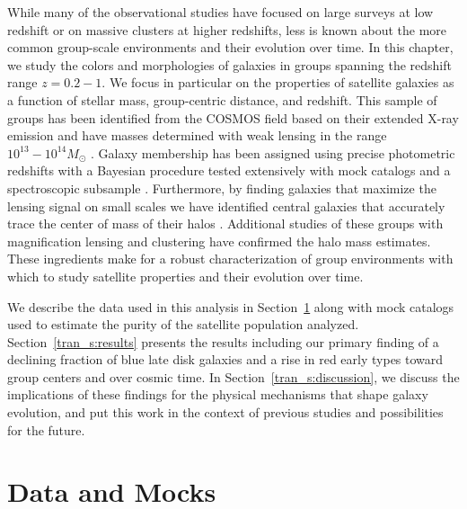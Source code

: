 While many of the observational studies have focused on large surveys
at low redshift or on massive clusters at higher redshifts, less is
known about the more common group-scale environments and their
evolution over time. In this chapter, we study the colors and
morphologies of galaxies in groups spanning the redshift range
$z=0.2-1$. We focus in particular on the properties of satellite
galaxies as a function of stellar mass, group-centric distance, and
redshift. This sample of groups has been identified from the COSMOS
field \citep{Scoville2007a} based on their extended X-ray emission and
have masses determined with weak lensing in the range $10^{13}-10^{14}
M_{\odot}$ \citep{Leauthaud2010}. Galaxy membership has been assigned
using precise photometric redshifts with a Bayesian procedure
tested extensively with mock catalogs and a spectroscopic subsample
\citep[Chapter~\ref{chap:catalog};][]{George2011}. Furthermore, by finding galaxies that maximize the
lensing signal on small scales we have identified central galaxies
that accurately trace the center of mass of their halos
\citep[Chapter~\ref{chap:centering};][]{George2012}. Additional studies of these
  groups with magnification lensing
\citep{Ford2012, Schmidt2012} and clustering \citep{Allevato2012} have
confirmed the halo mass estimates. These ingredients make for a robust
characterization of group environments with which to study satellite
properties and their evolution over time.

We describe the data used in this analysis in Section~\ref{tran_s:data}
along with mock catalogs used to estimate the purity of the satellite
population analyzed. Section~\ref{tran_s:results} presents the results
including our primary finding of a declining fraction of blue late
disk galaxies and a rise in red early types toward group centers and
over cosmic time. In Section~\ref{tran_s:discussion}, we discuss the
implications of these findings for the physical mechanisms that shape
galaxy evolution, and put this work in the context of previous studies
and possibilities for the future.


\section{Data and Mocks}
\label{tran_s:data}

